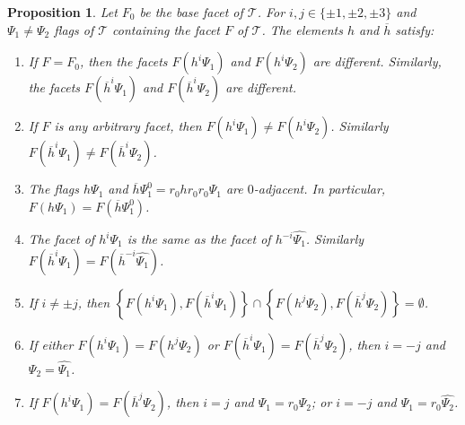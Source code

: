 \documentclass[final]{amsart}
\theoremstyle{plain}
\newtheorem{prop}[thm]{Proposition}
\theoremstyle{definition}
\theoremstyle{remark}
\numberwithin{equation}{section}
\renewcommand{\{}{\lbrace}
\renewcommand{\}}{\rbrace}
\renewcommand{\bar}{\overline}
\renewcommand{\hat}{\widehat}
\newcommand{\cT}{\mathcal{T}}
\newcommand{\kng}{{h}}
\newcommand{\etab}{\bar{\kng}}
\begin{document}
\begin{prop} \label{prop:etaIsGood}
Let $F_{0}$ be the base facet of $\cT$.
For $i,j \in \{\pm1, \pm 2, \pm 3\}$ and $\Psi_{1} \neq \Psi_{2}$ flags of $\cT$ containing the facet $F$ of $\cT$. 
The elements $\kng$ and $\etab$ satisfy:
\begin{enumerate}
    \item \label{item:baseFacet} If $F = F_{0}$, then the facets $F(\kng^{i} \Psi_{1})$ and $F(\kng^{i} \Psi_{2})$ are different.
    Similarly, the facets  $F(\etab^{i} \Psi_{1})$ and $F(\etab^{i} \Psi_{2})$ are different.
    \item \label{item:anyFacet} If $F$ is any arbitrary facet, then $F(\kng^{i} \Psi_{1}) \neq F(\kng^{i} \Psi_{2})$.
    Similarly $F(\etab^{i} \Psi_{1}) \neq F(\etab^{i} \Psi_{2})$.
    \item \label{item:barEta} The flags $\kng \Psi_{1}$ and $\etab \Psi_{1}^{0}=r_0 \kng r_0 r_0 \Psi_{1}$ are $0$-adjacent.
    In particular, $F(\kng \Psi_{1}) = F(\etab\Psi_{1}^{0})$.
\item \label{item:Antipoda} The facet of $\kng^{i} \Psi_{1}$ is the same as the facet of $\kng^{-i} \hat{\Psi_{1}} $.
    Similarly $F(\etab^{i} \Psi_{1}) = F(\etab^{-i} \hat{\Psi_{1}})$.
    \item \label{item:NMA} If $i \neq \pm j$, then $\left\{F(\kng^{i} \Psi_{1}), F(\etab^{i} \Psi_{1})\right\} \cap \left\{ F(\kng^{j} \Psi_{2}), F(\etab^{j}\Psi_{2}) \right\} = \emptyset$.
    \item \label{item:esAntipoda} If 
either $F(\kng^{i} \Psi_{1}) = F(\kng^{j} \Psi_{2}) $ or $F(\etab^{i} \Psi_{1}) = F(\etab^{j} \Psi_{2}) $, then $i = -j$ and $\Psi_{2}=\hat{\Psi_{1}}$.
    \item \label{item:esVecina} If 
$F(\kng^{i} \Psi_{1}) = F(\etab^{j} \Psi_{2}) $, then $i=j$ and $\Psi_{1} = r_{0}\Psi_{2}$; or $i = -j$ and $\Psi_{1}=r_0 \hat{\Psi_{2}}$. 


    

\end{enumerate}
\end{prop}
\end{document}
